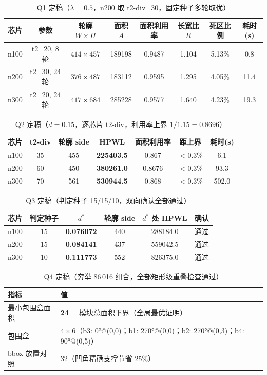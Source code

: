 \documentclass[12pt,a4paper]{article}
\begin{document}
\begin{table}[H]
\centering
\small
\caption{Q1 定稿（$\lambda=0.5$，n200 取 t2-div=30，固定种子多轮取优）}
\setlength{\tabcolsep}{3pt}
\begin{tabular}{lccccccc}
\toprule
芯片 & 参数 & 轮廓 $W\times H$ & 面积 $A$ & 面积利用率 & 长宽比 $R$ & 死区比例 & 耗时(s) \\
\midrule
n100 & t2=20, 8轮 & $414\times457$ & 189198 & 0.9487 & 1.104 & 5.13\% & 0.8 \\
n200 & t2=30, 24轮 & $376\times487$ & 183112 & 0.9595 & 1.295 & 4.05\% & 11.4 \\
n300 & t2=20, 24轮 & $417\times684$ & 285228 & 0.9577 & 1.640 & 4.23\% & 19.3 \\
\bottomrule
\end{tabular}
\end{table}

\begin{table}[H]
\centering
\small
\caption{Q2 定稿（$d=0.15$，逐芯片 t2-div，利用率上界 $1/1.15=0.8696$）}
\begin{tabular}{lcccccc}
\toprule
芯片 & t2-div & 轮廓 side & HPWL & 面积利用率 & 距上界 & 耗时(s) \\
\midrule
n100 & 35 & 455 & \textbf{225403.5} & 0.867 & $<0.3\%$ & 6.1 \\
n200 & 60 & 450 & \textbf{380261.0} & 0.8676 & $<0.3\%$ & 93.3 \\
n300 & 70 & 561 & \textbf{530944.5} & 0.868 & $<0.3\%$ & 502.0 \\
\bottomrule
\end{tabular}
\end{table}

\begin{table}[H]
\centering
\small
\caption{Q3 定稿（判定种子 15/15/10，双向确认全部通过）}
\begin{tabular}{lccccc}
\toprule
芯片 & 判定种子 & $d^*$ & 轮廓 side & $d^*$ 处 HPWL & 确认 \\
\midrule
n100 & 15 & \textbf{0.076072} & 440 & 288184.0 & 通过 \\
n200 & 15 & \textbf{0.084141} & 437 & 559042.5 & 通过 \\
n300 & 10 & \textbf{0.111773} & 552 & 826375.0 & 通过 \\
\bottomrule
\end{tabular}
\end{table}

\begin{table}[H]
\centering
\small
\caption{Q4 定稿（穷举 86\,016 组合，全部矩形级重叠检查通过）}
\begin{tabular}{ll}
\toprule
指标 & 值 \\
\midrule
最小包围盒面积 & \textbf{24} = 模块总面积下界（全局最优证明） \\
包围盒 & $4\times6$（b3: 0°@(0,0)；b1: 270°@(0,0)；b2: 270°@(0,3)；b4: 90°@(0,5)） \\
bbox 放置对照 & 32（凹角精确支撑节省 25\%） \\
\bottomrule
\end{tabular}
\end{table}
\end{document}
